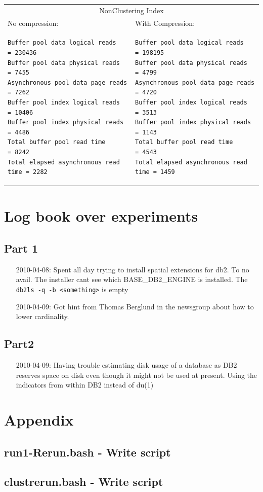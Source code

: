 \noindent\begin{tabular}{p{6.6cm}|p{6.6cm}}
  \multicolumn{2}{c}{NonClustering Index}\\
  No compression:&With Compression:\\ \hline
\noindent\footnotesize\begin{verbatim}
Buffer pool data logical reads       = 230436
Buffer pool data physical reads      = 7455
Asynchronous pool data page reads    = 7262
Buffer pool index logical reads      = 10406
Buffer pool index physical reads     = 4486
Total buffer pool read time          = 8242
Total elapsed asynchronous read time = 2282
\end{verbatim}
&
\noindent\footnotesize\begin{verbatim}
Buffer pool data logical reads       = 198195
Buffer pool data physical reads      = 4799
Asynchronous pool data page reads    = 4720
Buffer pool index logical reads      = 3513
Buffer pool index physical reads     = 1143
Total buffer pool read time          = 4543
Total elapsed asynchronous read time = 1459
\end{verbatim}
\\ \hline
\end{tabular}




\chapter{Log book over experiments}\label{log}
\section{Part 1}
\begin{itemize}
\item[2010-04-08:] Spent all day trying to install spatial extensions for db2.
To no avail. The installer cant see which BASE\_DB2\_ENGINE is installed. The
\verb|db2ls -q -b <something>| is empty
\item[2010-04-09:] Got hint from Thomas Berglund in the newsgroup about how to
  lower cardinality.
\end{itemize}

\section{Part2}
\begin{itemize}
\item[2010-04-09:] Having trouble estimating disk usage of a database as DB2
  reserves space on disk even though it might not be used at present. Using the
  indicators from within DB2 instead of du(1)
\end{itemize}
\appendix
\newpage
\chapter{Appendix}

\section{run1-Rerun.bash - Write script}\label{app:run1rr}


\section{clustrerun.bash - Write script}\label{app:clustrr}



